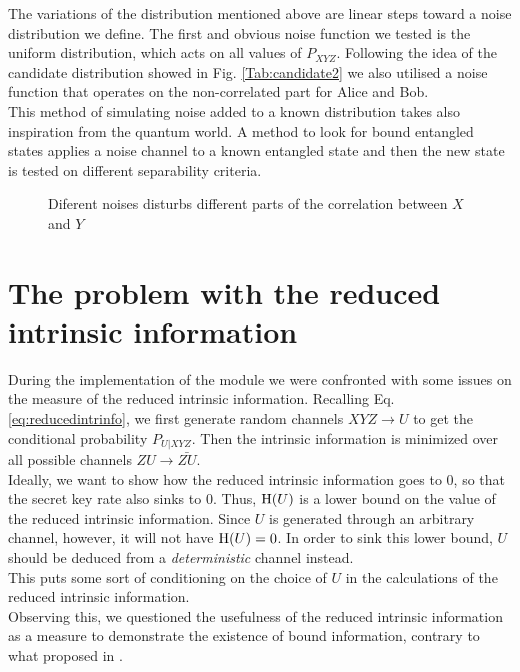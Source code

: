 	The variations of the distribution mentioned above are linear steps toward a noise distribution we define.
	The first and obvious noise function we tested is the uniform distribution, which acts on all values of $P_{XYZ}$.
	Following the idea of the candidate distribution showed in Fig. \ref{Tab:candidate2} we  also utilised a noise function that operates on the non-correlated part for Alice and Bob.\\
	
	This method of simulating noise added to a known distribution takes also inspiration from the quantum world. 
	A method to look for bound entangled states applies a noise channel to a known entangled state and then the new state is tested on different separability criteria.
	
	 
	\begin{figure}
		\begin{subfigure}{0.5\textwidth}
			
		\end{subfigure}
		\begin{subfigure}{0.5\textwidth}
			
		\end{subfigure}
		\caption{Diferent noises disturbs different parts of the correlation between $X$ and $Y$}
		\label{Fig:noises}
	\end{figure}
	
\section{The problem with the reduced intrinsic information}
    During the implementation of the module we were confronted with some issues on the measure of the reduced intrinsic information.
    Recalling Eq. \ref{eq:reducedintrinfo}, we first generate random channels $XYZ \rightarrow U$ to get the conditional probability $P_{U|XYZ}$. 
    Then the intrinsic information is minimized over all possible channels $ZU \rightarrow \bar{ZU}$.\\
    Ideally, we want to show how the reduced intrinsic information goes to $0$, so that the secret key rate also sinks to $0$. 
    Thus, $\operatorname{H} (U)$ is a lower bound on the value of the reduced intrinsic information.
    Since $U$ is generated through an arbitrary channel, however, it will not have $\operatorname{H} (U) = 0$.
    In order to sink this lower bound, $U$ should be deduced from a \emph{deterministic} channel instead.\\
    This puts some sort of conditioning on the choice of $U$ in the calculations of the reduced intrinsic information.\\
    
    Observing this, we questioned the usefulness of the reduced intrinsic information as a measure to demonstrate the existence of bound information, contrary to what proposed in \cite{RW03}. 
    
    